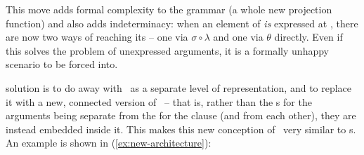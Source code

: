 \documentclass[output=paper]{langscibook}
\begin{document}
\vspace*{4\baselineskip}
\ea\label{ex:butt-et-al-architecture-augmented}
\hfill
{}
\hfill
\begin{minipage}{\widthof{\emptybracks}}
\end{minipage}
\vspace*{4\baselineskip}
\z
%
This move adds formal complexity to the grammar (a whole new projection
function) and also adds indeterminacy: when an element of \astruc{} \emph{is}
expressed at \fstruc{}, there are now two ways of reaching its \sstruc{} -- one
via $\sigma \circ \lambda$ and one via $\theta$ directly. Even if this solves
the problem of unexpressed arguments, it is a formally unhappy scenario to be
forced into.

 solution is to do away with \astruc\ as a separate level of
representation, and to replace it with a new, connected version of \sstruc\ --
that is, rather than the \sstruc{}s for the arguments being separate from the
\sstruc{} for the clause (and from each other), they are instead embedded inside
it. This makes this new conception of \sstruc\ very similar to
 \astruc{}s. An example is shown in
(\ref{ex:new-architecture}):%
%
\end{document}
